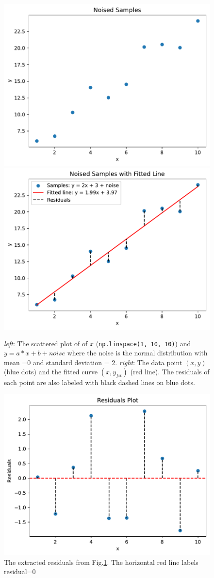 \documentclass[12pt,a4paper]{article}
\begin{document}
\begin{CJK}{UTF8}{bkai}
\begin{figure}[h]
    \centering
    \includegraphics[width=0.45\linewidth]{figures/practice_2_1_original_samples.pdf}
    \includegraphics[width=0.45\linewidth]{figures/practice_2_1_fitted_line.pdf}
    \caption{\textit{left}: The scattered plot of of $x$ (\texttt{np.linspace(1, 10, 10)}) and $y =a*x +b +noise$ where the noise is the normal distribution with mean =0 and standard deviation = 2. \textit{right}: The data point $(x, y)$ (blue dots) and the fitted curve $(x, y_{fit})$ (red line). The residuals of each point are also labeled with black dashed lines on blue dots.}
    \label{fig:practice_2_1_original}
\end{figure}
\begin{figure}[h]
    \centering
    \includegraphics[width=0.65\linewidth]{figures/practice_2_1_residuals.pdf}
    \caption{The extracted residuals from Fig.\ref{fig:practice_2_1_original}. The horizontal red line labels residual=0}
    \label{fig:practice_2_1_residual}
\end{figure}


\end{CJK}
\end{document}
